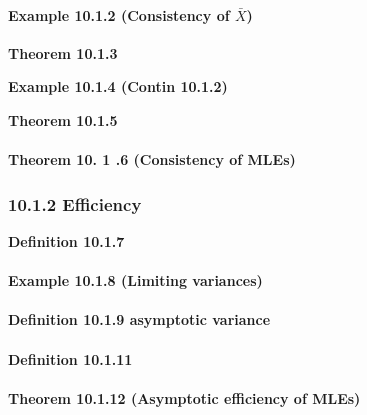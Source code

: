 \documentclass[6pt,Portrait]{article}
\let\oldparagraph\paragraph
\renewcommand{\paragraph}[1]{\oldparagraph{#1}\mbox{}}
\begin{document}
\hypertarget{consi-M}{%
\paragraph{\texorpdfstring{\textbf{Example 10.1.2 (Consistency of
\(\bar X\))}}{Example 10.1.2 (Consistency of \textbackslash{}bar X)}}\label{consi-M}}

\textbf{Theorem 10.1.3}

\textbf{Example 10.1.4 (Contin 10.1.2)}

\textbf{Theorem 10.1.5}

\hypertarget{consi-MLE}{%
\paragraph{\texorpdfstring{\textbf{Theorem 10. 1 .6 (Consistency of
MLEs)}}{Theorem 10. 1 .6 (Consistency of MLEs)}}\label{consi-MLE}}

\hypertarget{efficiency}{%
\subsubsection{10.1.2 Efficiency}\label{efficiency}}

\textbf{Definition 10.1.7}

\hypertarget{LimD}{%
\paragraph{\texorpdfstring{\textbf{Example 10.1.8 (Limiting
variances)}}{Example 10.1.8 (Limiting variances)}}\label{LimD}}

\hypertarget{asymV}{%
\paragraph{\texorpdfstring{\textbf{Definition 10.1.9 asymptotic
variance}}{Definition 10.1.9 asymptotic variance}}\label{asymV}}

\hypertarget{effi}{%
\paragraph{\texorpdfstring{\textbf{Definition
10.1.11}}{Definition 10.1.11}}\label{effi}}

\hypertarget{asymE}{%
\paragraph{\texorpdfstring{\textbf{Theorem 10.1.12 (Asymptotic
efficiency of
MLEs)}}{Theorem 10.1.12 (Asymptotic efficiency of MLEs)}}\label{asymE}}
\end{document}
